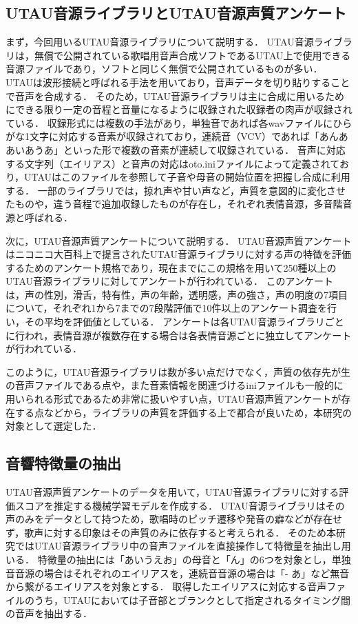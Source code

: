 \documentclass[a4j,8pt,twocolumn]{extarticle}
\begin{document}
\subsection{UTAU音源ライブラリとUTAU音源声質アンケート}
まず，今回用いるUTAU音源ライブラリについて説明する．
UTAU音源ライブラリは，無償で公開されている歌唱用音声合成ソフトであるUTAU上で使用できる音源ファイルであり，ソフトと同じく無償で公開されているものが多い．
UTAUは波形接続と呼ばれる手法を用いており，音声データを切り貼りすることで音声を合成する．
そのため，UTAU音源ライブラリは主に合成に用いるためにできる限り一定の音程と音量になるように収録された収録者の肉声が収録されている．
収録形式には複数の手法があり，単独音であれば各wavファイルにひらがな1文字に対応する音素が収録されており，連続音（VCV）であれば「あんああいあうあ」\cite{tatsu3shiki}といった形で複数の音素が連続して収録されている．
音声に対応する文字列（エイリアス）と音声の対応はoto.iniファイルによって定義されており，UTAUはこのファイルを参照して子音や母音の開始位置を把握し合成に利用する．
一部のライブラリでは，掠れ声や甘い声など，声質を意図的に変化させたものや，違う音程で追加収録したものが存在し，それぞれ表情音源，多音階音源と呼ばれる．

次に，UTAU音源声質アンケート\cite{utausurvey}について説明する．
UTAU音源声質アンケートはニコニコ大百科上で提言されたUTAU音源ライブラリに対する声の特徴を評価するためのアンケート規格であり，現在までにこの規格を用いて250種以上のUTAU音源ライブラリに対してアンケートが行われている．
このアンケートは，声の性別，滑舌，特有性，声の年齢，透明感，声の強さ，声の明度の7項目について，それぞれ1から7までの7段階評価で10件以上のアンケート調査を行い，その平均を評価値としている．
アンケートは各UTAU音源ライブラリごとに行われ，表情音源が複数存在する場合は各表情音源ごとに独立してアンケートが行われている．

このように，UTAU音源ライブラリは数が多い点だけでなく，声質の依存先が生の音声ファイルである点や，また音素情報を関連づけるiniファイルも一般的に用いられる形式であるため非常に扱いやすい点，UTAU音源声質アンケートが存在する点などから，ライブラリの声質を評価する上で都合が良いため，本研究の対象として選定した．

\subsection{音響特徴量の抽出}
UTAU音源声質アンケートのデータを用いて，UTAU音源ライブラリに対する評価スコアを推定する機械学習モデルを作成する．
UTAU音源ライブラリはその声のみをデータとして持つため，歌唱時のピッチ遷移や発音の癖などが存在せず，歌声に対する印象はその声質のみに依存すると考えられる．
そのため本研究ではUTAU音源ライブラリ中の音声ファイルを直接操作して特徴量を抽出し用いる．
特徴量の抽出には「あいうえお」の母音と「ん」の6つを対象とし，単独音音源の場合はそれぞれのエイリアスを，連続音音源の場合は「- あ」など無音から繋がるエイリアスを対象とする．
取得したエイリアスに対応する音声ファイルのうち，UTAUにおいては子音部とブランクとして指定されるタイミング間の音声を抽出する．
\end{document}
